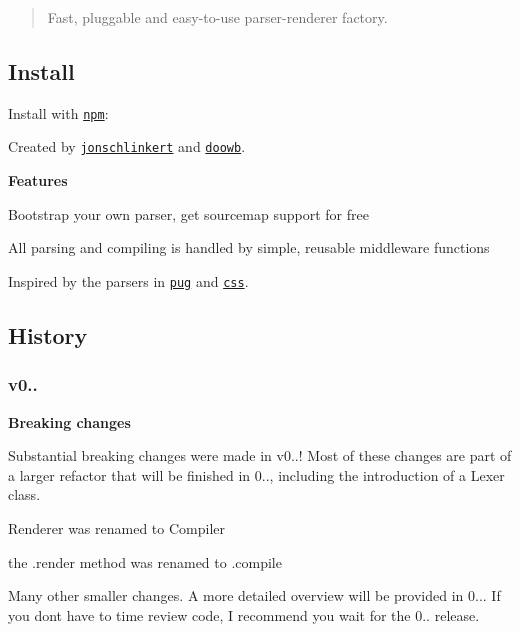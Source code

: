 \begin{quote}
Fast, pluggable and easy-\/to-\/use parser-\/renderer factory. \end{quote}


\subsection*{Install}

Install with \href{https://www.npmjs.com/}{\tt npm}\+:




Created by \href{https://github.com/jonschlinkert}{\tt jonschlinkert} and \href{https://github.com/doowb}{\tt doowb}.

{\bfseries Features}


\begin{DoxyItemize}
\item Bootstrap your own parser, get sourcemap support for free
\item All parsing and compiling is handled by simple, reusable middleware functions
\item Inspired by the parsers in \href{http://jade-lang.com}{\tt pug} and \href{https://github.com/reworkcss/css}{\tt css}.
\end{DoxyItemize}

\subsection*{History}

\subsubsection*{v0..}

{\bfseries Breaking changes}

Substantial breaking changes were made in v0..! Most of these changes are part of a larger refactor that will be finished in 0.., including the introduction of a {\ttfamily Lexer} class.


\begin{DoxyItemize}
\item Renderer was renamed to {\ttfamily Compiler}
\item the {\ttfamily .render} method was renamed to {\ttfamily .compile}
\item Many other smaller changes. A more detailed overview will be provided in 0... If you don\textquotesingle{}t have to time review code, I recommend you wait for the 0.. release.
\end{DoxyItemize}

